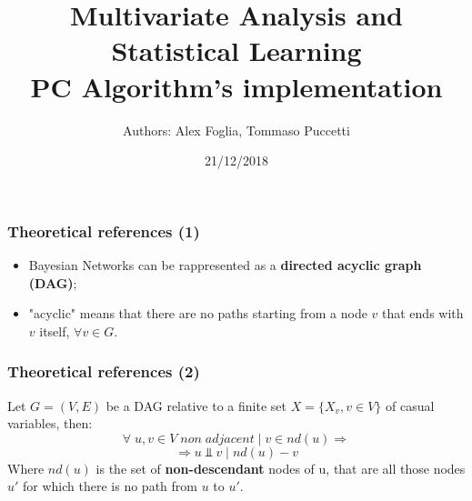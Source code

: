 \documentclass[xcolor ={table,usenames,dvipsnames}]{beamer}
\title{Multivariate Analysis and Statistical Learning \\PC Algorithm's implementation}
\author{Authors: Alex Foglia, Tommaso Puccetti}
\institute{Universit\`a  degli Studi di Firenze}
\date{21/12/2018}
\theoremstyle{definition}
\begin{document}
	
	\begin{frame}
		\maketitle
	\end{frame}

	\begin{frame}
		\frametitle{Theoretical references (1)}
		\begin{itemize}
			\item Bayesian Networks can be rappresented as a \textbf{directed acyclic graph (DAG)};
			\item "acyclic" means that there are no paths starting from a node $v$ that ends with $v$ itself, $\forall v \in G$.
			
		\end{itemize}
	\end{frame}

	\begin{frame}
		\frametitle{Theoretical references (2)}
		Let $G = (V,E)$ be a DAG relative to a finite set  $X = \{X_{v}, v \in V\}$ of casual variables, then:
		$$
		\forall\; u,v \in V \;non\;adjacent\;|\; v \in nd(u) \Rightarrow 
		$$
		$$\Rightarrow u \Perp v \;|\; nd(u) - v $$
	Where $nd(u)$ is the set of \textbf{non-descendant} nodes of u, that are all those nodes $u'$ for which there is no path from $u$ to $u'$. \\
	\end{frame}
\end{document}

